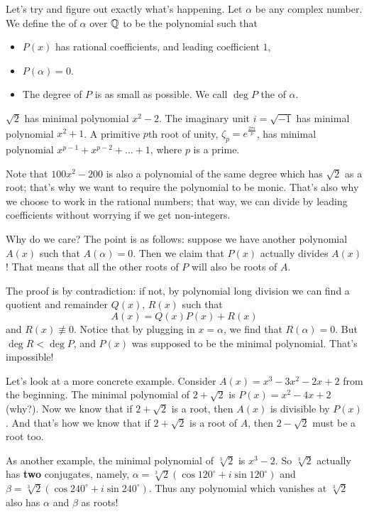 Let's try and figure out exactly what's happening.
Let $\alpha$ be any complex number.
We define the  of $\alpha$ over $\mathbb Q$ to be the polynomial such that
\begin{itemize}
	\item $P(x)$ has rational coefficients, and leading coefficient $1$,
	\item $P(\alpha) = 0$.
	\item The degree of $P$ is as small as possible.
		We call $\deg P$ the  of $\alpha$.
\end{itemize}
\begin{example}
	\listhack
	\begin{enumerate}[(a)]
	\ii $\sqrt 2$ has minimal polynomial $x^2-2$.
	\ii The imaginary unit $i = \sqrt{-1}$ has minimal polynomial $x^2+1$.
	\ii A primitive $p$th root of unity, $\zeta_p = e^{\frac{2\pi i}{p}}$, has minimal polynomial $x^{p-1} + x^{p-2} + \dots + 1$, where $p$ is a prime.
	\end{enumerate}
\end{example}
Note that $100x^2 - 200$ is also a polynomial of the same degree which has $\sqrt 2$ as a root; that's why we want to require the polynomial to be monic. That's also why we choose to work in the rational numbers; that way, we can divide by leading coefficients without worrying if we get non-integers.

Why do we care? The point is as follows: suppose we have another polynomial $A(x)$ such that $A(\alpha) = 0$.
Then we claim that $P(x)$ actually divides $A(x)$!
That means that all the other roots of $P$ will also be roots of $A$.

The proof is by contradiction: if not, by polynomial long division we can find a quotient and remainder $Q(x)$, $R(x)$ such that
\[ A(x) = Q(x) P(x) + R(x) \]
and $R(x) \not\equiv 0$.
Notice that by plugging in $x = \alpha$, we find that $R(\alpha) = 0$.
But $\deg R < \deg P$, and $P(x)$ was supposed to be the minimal polynomial.
That's impossible!

Let's look at a more concrete example.
Consider $A(x) = x^3-3x^2-2x+2$ from the beginning. 
The minimal polynomial of $2 + \sqrt 2$ is $P(x) = x^2 - 4x + 2$ (why?).
Now we know that if $2 + \sqrt 2$ is a root, then $A(x)$ is divisible by $P(x)$.
And that's how we know that if $2 + \sqrt 2$ is a root of $A$, then $2 - \sqrt 2$ must be a root too.

As another example, the minimal polynomial of $\sqrt[3]{2}$ is $x^3-2$. So $\sqrt[3]{2}$ actually has \textbf{two} conjugates, namely, $\alpha = \sqrt[3]{2} \left( \cos 120^\circ + i \sin 120^\circ \right)$ and $\beta = \sqrt[3]{2} \left( \cos 240^\circ + i \sin 240^\circ \right)$. Thus any polynomial which vanishes at $\sqrt[3]{2}$ also has $\alpha$ and $\beta$ as roots!

